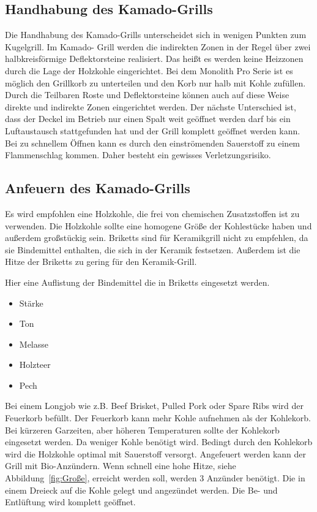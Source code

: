 \subsection{Handhabung des Kamado-Grills}

	Die Handhabung des Kamado-Grills unterscheidet sich in wenigen Punkten 
	zum Kugelgrill. Im Kamado-
	Grill werden die indirekten Zonen in der Regel über zwei halbkreisförmige 
	Deflektorsteine realisiert. 
	Das heißt es werden keine Heizzonen durch die Lage der Holzkohle 
	eingerichtet. Bei dem Monolith Pro Serie ist
	es möglich den Grillkorb zu unterteilen und den Korb nur halb mit Kohle 
	zufüllen. Durch die Teilbaren 
	Roste und Deflektorsteine können auch auf diese Weise direkte und indirekte 
	Zonen eingerichtet 
	werden.
	Der nächste Unterschied ist, dass der Deckel im Betrieb nur einen Spalt weit 
	geöffnet werden darf bis 
	ein Luftaustausch stattgefunden hat und der Grill komplett geöffnet werden 
	kann. Bei zu schnellem Öffnen kann es durch den einströmenden 
	Sauerstoff zu einem Flammenschlag kommen. Daher besteht ein gewisses 
	Verletzungsrisiko.

\subsection{Anfeuern des Kamado-Grills}

	Es wird empfohlen eine Holzkohle, die frei von chemischen Zusatzstoffen ist zu 
	verwenden. Die Holzkohle
	sollte eine homogene Größe der Kohlestücke haben und außerdem großstückig 
	sein. Briketts sind für Keramikgrill
	nicht zu empfehlen, da sie Bindemittel enthalten, die sich in der Keramik 
	festsetzen. Außerdem ist die
	Hitze der Briketts zu gering für den Keramik-Grill.
	
	Hier eine Auflistung der Bindemittel die in Briketts eingesetzt werden.

	\begin{itemize}[noitemsep]
		\item Stärke
		\item Ton
		\item Melasse
		\item Holzteer
		\item Pech
	\end{itemize}
 
  
	Bei einem Longjob wie z.B. Beef Brisket, Pulled Pork oder Spare Ribs wird der 
	Feuerkorb befüllt. Der 
	Feuerkorb kann mehr Kohle aufnehmen als der  Kohlekorb. Bei kürzeren 
	Garzeiten, aber höheren 
	Temperaturen sollte der Kohlekorb eingesetzt werden. Da weniger Kohle 
	benötigt wird. Bedingt durch 
	den Kohlekorb wird die Holzkohle optimal mit Sauerstoff versorgt.
	Angefeuert werden kann der Grill mit Bio-Anzündern. Wenn schnell eine hohe 
	Hitze, siehe 
	Abbildung~\vref{fig:Große}, erreicht werden soll, werden 3 Anzünder benötigt. 
	Die in einem Dreieck auf 
	die Kohle gelegt und angezündet werden. Die Be- und Entlüftung wird komplett 
	geöffnet.
	
